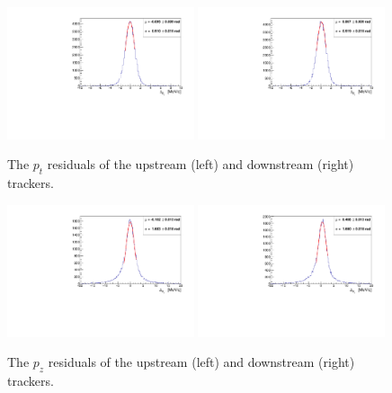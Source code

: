   \begin{figure}[p]
    \begin{center}
      \includegraphics[width=0.49\textwidth, angle=0]{08-Performance/upstream_pt_residual.pdf}
      \includegraphics[width=0.49\textwidth, angle=0]{08-Performance/downstream_pt_residual.pdf}
      \caption{\label{fig:PtResidKalman} The $p_{t}$ residuals of the upstream (left) and downstream (right) trackers.}
    \end{center}
  \end{figure}
  
   \begin{figure}[p]
    \begin{center}
      \includegraphics[width=0.49\textwidth, angle=0]{08-Performance/upstream_pz_residual.pdf}
      \includegraphics[width=0.49\textwidth, angle=0]{08-Performance/downstream_pz_residual.pdf}
      \caption{\label{fig:PzResidKalman} The $p_z$ residuals of the upstream (left) and downstream (right) trackers.}
    \end{center}
  \end{figure}
  
